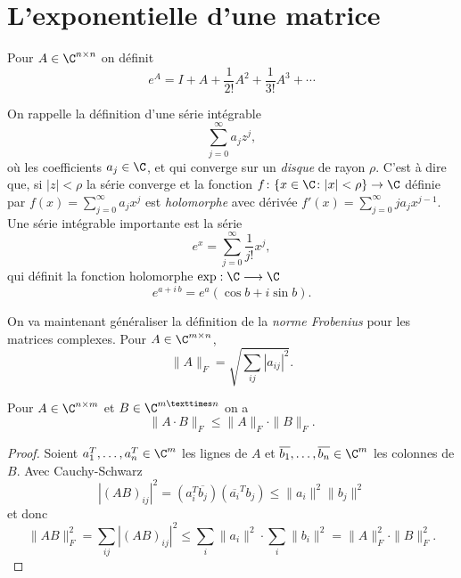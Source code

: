 \section{L'exponentielle d'une matrice}
\label{sec:lexp-dune-matr}


\begin{definition}
  \label{def:28}
  Pour $A \in \C^{n \times n}$ on définit 
  \begin{displaymath}
    e^A = I + A + \frac{1}{2!} A^2 + \frac{1}{3!}A^3 + \cdots 
  \end{displaymath}
\end{definition}

\noindent On rappelle la définition d'une série intégrable 
\begin{displaymath}
  \sum_{j=0}^\infty a_j z^j,
\end{displaymath}
où les coefficients $a_j \in\C$, et
qui converge sur un \emph{disque} de rayon $\rho$. C'est à dire que, si $|z|< \rho$ la série converge et la fonction $f\colon \{x \in \C \colon |x| < \rho \}  \rightarrow \C$ définie par $f(x) = \sum_{j=0}^\infty a_j x^j $ est \emph{holomorphe} avec dérivée $f'(x) =  \sum_{j=0}^\infty j a_j x^{j-1}$. 
Une série intégrable importante est la série
\begin{displaymath}
  e^{x} = \sum_{j=0}^\infty \frac{1}{j!} x^j,
\end{displaymath}
qui définit la fonction holomorphe $\exp: \C \longrightarrow \C$ 
\begin{displaymath}
  e^{a+i\,b} = e^a (\cos b + i \sin b).  
\end{displaymath}

\noindent On va maintenant généraliser la définition de la \emph{norme Frobenius} pour les matrices complexes. Pour $A \in \C^{m\times n}$, 
\begin{displaymath}
  \|A\|_F = \sqrt{\sum_{ij} |a_{ij}|^2 }. 
\end{displaymath}

\begin{lemma}
  \label{lem:16}
  Pour $A \in \C^{n \times m}$ et $B \in \C^{m × n}$  on a 
  \begin{displaymath}
    \|A\cdot B\|_F \leq \|A\|_F\cdot \|B\|_F. 
  \end{displaymath}
\end{lemma}

  \begin{proof}Soient $a_1^T,\dots,a_n^T \in \C^m$ les lignes de $A$ et $\overline{b_1},\dots,\overline{b_n} \in \C^m$ les colonnes de $B$. Avec Cauchy-Schwarz 
    \begin{displaymath}
          |(AB)_{ij}|^2 = (a_i^T \overline{b_j})(\overline{a_i}^T b_j)  \leq \|a_i\|^2 \|b_j\|^2
    \end{displaymath}
et donc 
\begin{displaymath}
  \|AB\|_F^2 = \sum_{ij} |(AB)_{ij}|^2 \leq \sum_i\|a_i\|^2 \cdot \sum_i \|b_i\|^2 = \|A\|_F^2 \cdot \|B\|_F^2. 
\end{displaymath}
  \end{proof}


